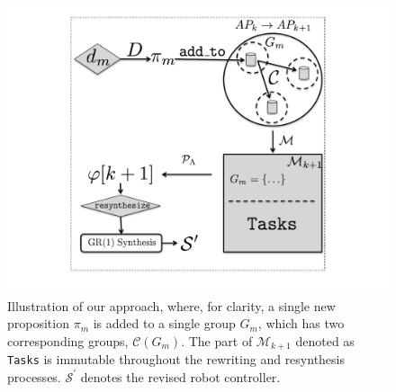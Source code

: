 \begin{figure}[t]
	\centering
	\includegraphics[width=0.9\columnwidth, clip]{./img/approach.pdf}
	\caption{Illustration of our approach, where, for clarity, a single new proposition $\pi_{m}$ is added to a single group $G_m$, which has two corresponding groups, $\mathcal{C}(G_m)$. The part of $\mathcal{M}_{k+1}$ denoted as \texttt{Tasks} is immutable throughout the rewriting and resynthesis processes. $\mathcal{S}^\prime$ denotes the revised robot controller.} %
	\label{Fig:approach}
\end{figure}

